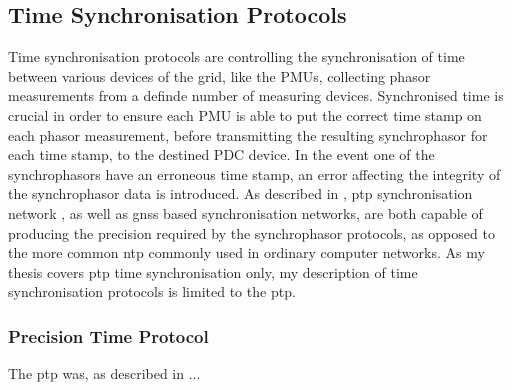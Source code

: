 \subsection{Time Synchronisation Protocols}
Time synchronisation protocols are controlling the synchronisation of time between various devices of the grid, like the PMUs, collecting phasor measurements from a definde number of measuring devices. Synchronised time is crucial in order to ensure each PMU is able to put the correct time stamp on each phasor measurement, before transmitting the resulting synchrophasor for each time stamp, to the destined PDC device. In the event one of the synchrophasors have an erroneous time stamp, an error affecting the integrity of the synchrophasor data is introduced. As described in \cite{moussa2016security}, \acrlong{ptp} synchronisation network
, as well as \acrlong{gnss} based synchronisation networks, are both capable of producing the precision required by the synchrophasor protocols, as opposed to the more common \acrfull{ntp} commonly used in ordinary computer networks. As my thesis covers \acrshort{ptp} time synchronisation only, my description of time synchronisation protocols is limited to the \acrfull{ptp}.

\subsubsection{Precision Time Protocol}

The \acrfull{ptp} was, as described in \cite{alghamdi2021precision} ...